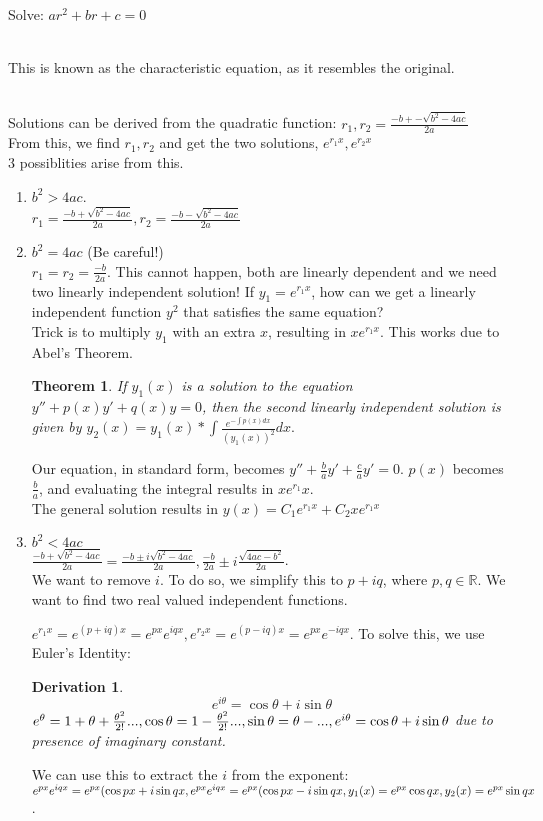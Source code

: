 \documentclass{article}
\newtheorem{theorem}{Theorem}
\newtheorem{derivation}{Derivation}
\begin{document}
Solve: $ar^2+br+c=0$
\begin{indent}
\\	This is known as the characteristic equation, as it resembles the original.
\end{indent}
\\Solutions can be derived from the quadratic function: $r_1, r_2=\frac{-b +- \sqrt{b^2-4ac}}{2a}$
	\\From this, we find $r_1, r_2$ and get the two solutions, $e^{r_1 x}, e^{r_2 x}$
\\3 possiblities arise from this.
\begin{enumerate}
	\item $b^2>4ac$.
		\\$r_1=\frac{-b + \sqrt{b^2-4ac}}{2a}, r_2=\frac{-b -\sqrt{b^2-4ac}}{2a}$
	\item $b^2=4ac$ (Be careful!)
		\\$r_1=r_2=\frac{-b}{2a}$. This cannot happen, both are linearly dependent and we need two linearly independent solution! If $y_1=e^{r_1 x}$, how can we get a linearly independent function $y^2$ that satisfies the same equation?
		\\Trick is to multiply $y_1$ with an extra $x$, resulting in $xe^{r_1 x}$. This works due to Abel's Theorem.
		\begin{theorem}
		If $y_1(x)$ is a solution to the equation $y''+p(x)y'+q(x)y=0$, then the second linearly independent solution is given by $y_2(x)=y_1(x)*\int{\frac{e^{-\int{p(x)dx}}}{(y_1(x))^2}dx}.$\end{theorem}
		Our equation, in standard form, becomes $y''+\frac{b}{a}y'+\frac{c}{a}y'=0$.
	$p(x)$ becomes $\frac{b}{a}$, and evaluating the integral results in $xe^{r_1}x$.
	\\The general solution results in $y(x)=C_1 e^{r_1 x}+C_2 xe^{r_1 x}$
	\item $b^2<4ac$
		\\$\frac{-b + \sqrt{b^2-4ac}}{2a}=\frac{-b \pm i\sqrt{b^2-4ac}}{2a}, 
		\frac{-b}{2a}\pm i \frac{\sqrt{4ac-b^2}}{2a}$.
		\\We want to remove $i$. 
		To do so, we simplify this to $p+iq$, where $p,q \in \mathbb{R}$. 
		We want to find two real valued independent functions.
		
		$e^{r_1 x}=e^{(p+iq)x}=e^{px}e^{iqx}, e^{r_2x}=e^{(p-iq)x}=e^{px}e^{-iqx}$.
		To solve this, we use Euler's Identity:
		\begin{derivation}
			\begin{equation}
				e^{i\theta}=\cos{\theta}+i \sin{\theta}
			\end{equation}
			$e^\theta=1+\theta+\frac{\theta^2}{2!}..., 
			\cos{\theta}=1-\frac{\theta^2}{2!}...,
			\sin{\theta}=\theta-..., 
			\\e^{i\theta}=\cos{\theta}+i \sin{\theta}$ 
			due to presence of imaginary constant.
		\end{derivation}
		We can use this to extract the $i$ from the exponent: 
		$e^{px}e^{iqx}=e^{px}(\cos{px}+i\sin{qx}, e^{px}e^{iqx}=e^{px}(\cos{px}-i\sin{qx}, 
		\\y_1(x)=e^{px}\cos{qx}, y_2(x)=e^{px}\sin{qx}$.
		

\end{enumerate}
\end{document}
